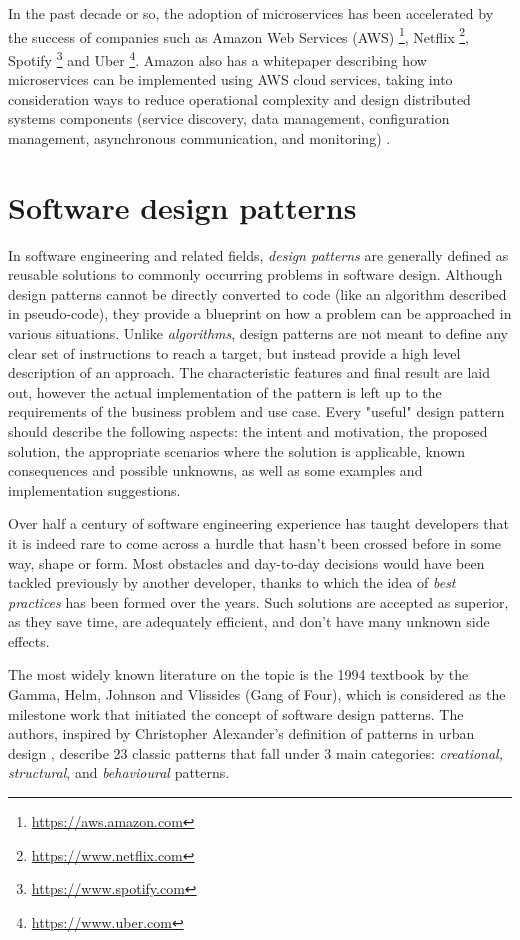 In the past decade or so, the adoption of microservices has been accelerated by the success of companies such as Amazon Web Services (AWS) \footnote{\url{https://aws.amazon.com}}, Netflix \footnote{\url{https://www.netflix.com}}, Spotify \footnote{\url{https://www.spotify.com}} and Uber \footnote{\url{https://www.uber.com}}. Amazon also has a whitepaper describing how microservices can be implemented using AWS cloud services, taking into consideration ways to reduce operational complexity and design distributed systems components (service discovery, data management, configuration management, asynchronous communication, and monitoring) \cite{aws-microservices}.

\section{Software design patterns}

In software engineering and related fields, \textit{design patterns} are generally defined as reusable solutions to commonly occurring problems in software design. Although design patterns cannot be directly converted to code (like an algorithm described in pseudo-code), they provide a blueprint on how a problem can be approached in various situations. Unlike \textit{algorithms}, design patterns are not meant to define any clear set of instructions to reach a target, but instead provide a high level description of an approach. The characteristic features and final result are laid out, however the actual implementation of the pattern is left up to the requirements of the business problem and use case. Every "useful" design pattern should describe the following aspects: the intent and motivation, the proposed solution, the appropriate scenarios where the solution is applicable, known consequences and possible unknowns, as well as some examples and implementation suggestions.

Over half a century of software engineering experience has taught developers that it is indeed rare to come across a hurdle that hasn't been crossed before in some way, shape or form. Most obstacles and day-to-day decisions would have been tackled previously by another developer, thanks to which the idea of \textit{best practices} has been formed over the years. Such solutions are accepted as superior, as they save time, are adequately efficient, and don't have many unknown side effects.

The most widely known literature on the topic is the 1994 textbook \cite{gof94} by the Gamma, Helm, Johnson and Vlissides (Gang of Four), which is considered as the milestone work that initiated the concept of software design patterns. The authors, inspired by Christopher Alexander's definition of patterns in urban design \cite{alexander77}, describe 23 classic patterns that fall under 3 main categories: \textit{creational, structural}, and \textit{behavioural} patterns.

